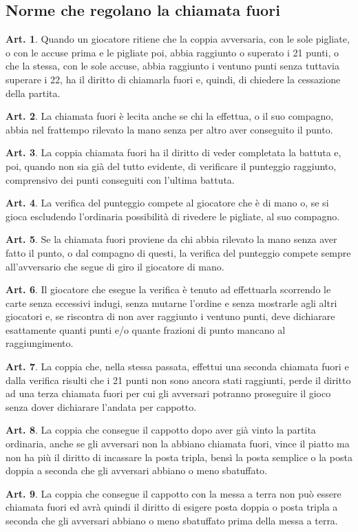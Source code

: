 \documentclass[italian,a4paper]{article}
\theoremstyle{definition}
\newtheorem{art}{Art.}
\begin{document}
\subsection{Norme che regolano la chiamata fuori}
\begin{art}
Quando un giocatore ritiene che la coppia avversaria, con le sole pigliate, o con le accuse prima e le pigliate poi, abbia raggiunto o superato i 21 punti, o che la stessa, con le sole accuse, abbia raggiunto i ventuno punti senza tuttavia superare i 22, ha il diritto di chiamarla fuori e, quindi, di chiedere la cessazione della partita.
\end{art}
\begin{art}
La chiamata fuori è lecita anche se chi la effettua, o il suo compagno, abbia nel frattempo rilevato la mano senza per altro aver conseguito il punto.
\end{art}
\begin{art}
La coppia chiamata fuori ha il diritto di veder completata la battuta e, poi, quando non sia già del tutto evidente, di verificare il punteggio raggiunto, comprensivo dei punti conseguiti con l'ultima battuta.
\end{art}
\begin{art}
La verifica del punteggio compete al giocatore che è di mano o, se si gioca escludendo l'ordinaria possibilità di rivedere le pigliate, al suo compagno.
\end{art}
\begin{art}
Se la chiamata fuori proviene da chi abbia rilevato la mano senza aver fatto il punto, o dal compagno di questi, la verifica del punteggio compete sempre all'avversario che segue di giro il giocatore di mano.
\end{art}
\begin{art}
Il giocatore che esegue la verifica è tenuto ad effettuarla scorrendo le carte senza eccessivi indugi, senza mutarne l'ordine e  senza mostrarle agli altri giocatori e, se riscontra di non aver raggiunto i ventuno punti, deve dichiarare esattamente quanti punti e/o quante frazioni di punto mancano al raggiungimento.
\end{art}
\begin{art}
La coppia che, nella stessa passata, effettui una seconda chiamata fuori e dalla verifica risulti che i 21 punti non sono ancora stati raggiunti, perde il diritto ad una terza chiamata fuori per cui gli avversari potranno proseguire il gioco senza dover dichiarare l'andata per cappotto.
\end{art}
\begin{art}
La coppia che consegue il cappotto dopo aver già vinto la partita ordinaria, anche se gli avversari non la abbiano chiamata fuori, vince il piatto ma non ha più il diritto di incassare la posta tripla, bensì la posta semplice o la posta doppia a seconda che gli avversari abbiano o meno sbatuffato.
\end{art}
\begin{art}
La coppia che consegue il cappotto con la messa a terra non può essere chiamata fuori ed avrà quindi il diritto di esigere  posta doppia o  posta tripla a seconda che gli avversari abbiano o meno sbatuffato prima della messa a terra.
\end{art}
\end{document}
